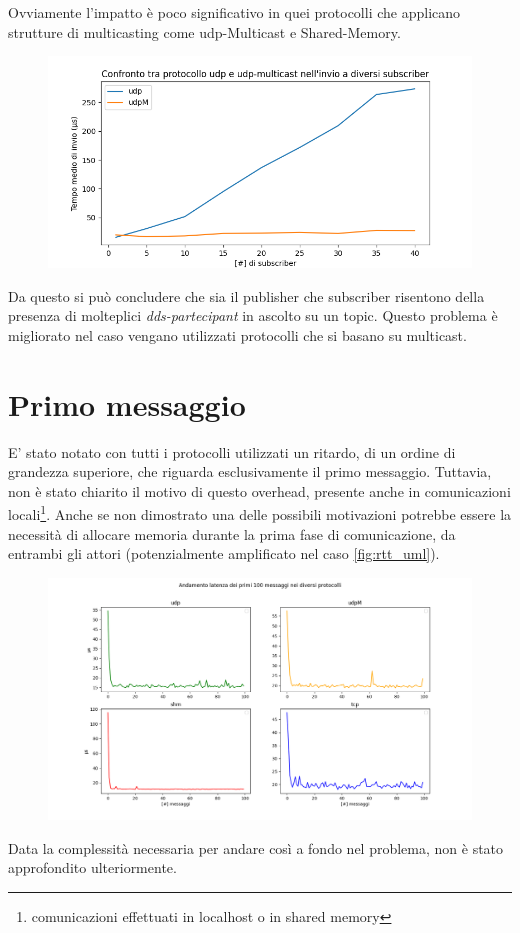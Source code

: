 Ovviamente l'impatto è poco significativo in quei protocolli che applicano strutture di \gls{multicasting} come udp-Multicast e Shared-Memory. 

\begin{figure}[H]
    \includegraphics[width=\textwidth]{./results/test3_udpvsudpM.png} 
        \caption{} %
        \label{}
\end{figure}

Da questo si può concludere che sia il publisher che subscriber risentono della presenza di molteplici \emph{dds-partecipant} in ascolto su un topic. Questo problema è migliorato nel caso vengano utilizzati protocolli che si basano su multicast. 

\section{Primo messaggio}
E' stato notato con tutti i protocolli utilizzati un ritardo, di un ordine di grandezza superiore, che riguarda esclusivamente il primo messaggio. Tuttavia, non è stato chiarito il motivo di questo \gls{overhead}, presente anche in comunicazioni locali\footnote{comunicazioni effettuati in localhost o in shared memory}. Anche se non dimostrato una delle possibili motivazioni potrebbe essere la necessità di allocare memoria durante la prima fase di comunicazione, da entrambi gli attori (potenzialmente amplificato nel caso \ref{fig:rtt_uml}). 
\begin{figure}[H]
    \includegraphics[width=\textwidth]{./results/errortest.png} 
    \caption{} %
    \label{}
\end{figure}
Data la complessità necessaria per andare così a fondo nel problema, non è stato approfondito ulteriormente.

